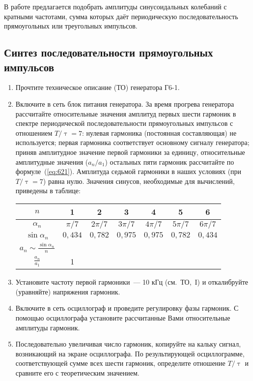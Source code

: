 \begin{lab:task}
	
В работе предлагается подобрать амплитуды синусоидальных колебаний с кратными частотами, сумма которых даёт
периодическую последовательность прямоугольных или треугольных импульсов.

\subsection*{Синтез последовательности прямоугольных импульсов}

\begin{enumerate}
	\item Прочтите техническое описание (ТО) генератора Г6-1.
	\item\label{task} Включите в сеть блок питания генератора. За время прогрева генератора рассчитайте относительные значения амплитуд первых шести гармоник в спектре периодической последовательности прямоугольных импульсов с отношением $T/\uptau=7$: нулевая гармоника (постоянная составляющая) не используется; первая гармоника соответствует основному сигналу генератора; приняв амплитудное значение первой гармоники за единицу, относительные амплитудные значения ($a_n/a_1$) остальных пяти гармоник рассчитайте по формуле~(\ref{eq:621}). Амплитуда седьмой гармоники в наших условиях (при $T/\uptau=7$) равна нулю. Значения синусов, необходимые для вычислений, приведены в таблице:
	
\begin{center}
\begin{tabular}{|c|c|c|c|c|c|c|} \hline
$n$ & 1 & 2 & 3 & 4 & 5 & 6 \\ \hline $\alpha_n$&$\pi /7$&$2\pi /7$&$3\pi /7$&$4\pi /7$&$5\pi /7$& $6\pi /7$ \\ \hline
$\sin \alpha_n$ & $0{,}434$ & $0{,}782$ & $0{,}975$ & $0{,}975$ &$0{,}782$ & $0{,}434$ \\ \hline $a_n\sim\frac{\sin
\alpha_n}{n}$& & & & & & \\ \hline $\frac{a_n}{a_1}$&1& & & & & \\ \hline
\end{tabular}
\end{center}
	
	\item Установите частоту первой гармоники~--- 10 кГц (см.~ТО,~I) и откалибруйте (уравняйте) напряжения гармоник.
	\item Включите в сеть осциллограф и проведите регулировку фазы гармоник. С помощью осциллографа установите рассчитанные Вами относительные амплитуды гармоник.
	\item Последовательно увеличивая число гармоник, копируйте на кальку сигнал, возникающий на экране осциллографа. По результирующей осциллограмме, соответствующей сумме всех шести гармоник, определите отношение $T/\uptau$ и сравните его с теоретическим значением.
\end{enumerate}


\end{lab:task}

